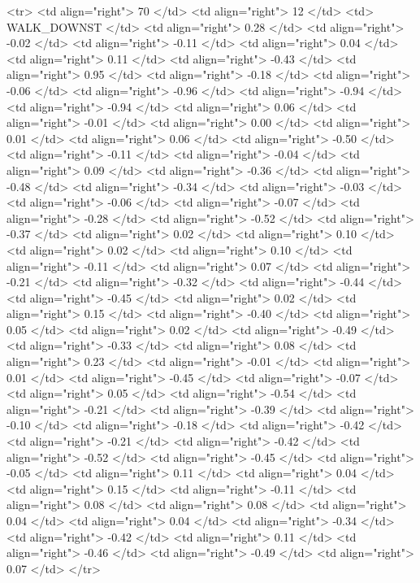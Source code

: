   <tr> <td align="right"> 70 </td> <td align="right">  12 </td> <td> WALK_DOWNST </td> <td align="right"> 0.28 </td> <td align="right"> -0.02 </td> <td align="right"> -0.11 </td> <td align="right"> 0.04 </td> <td align="right"> 0.11 </td> <td align="right"> -0.43 </td> <td align="right"> 0.95 </td> <td align="right"> -0.18 </td> <td align="right"> -0.06 </td> <td align="right"> -0.96 </td> <td align="right"> -0.94 </td> <td align="right"> -0.94 </td> <td align="right"> 0.06 </td> <td align="right"> -0.01 </td> <td align="right"> 0.00 </td> <td align="right"> 0.01 </td> <td align="right"> 0.06 </td> <td align="right"> -0.50 </td> <td align="right"> -0.11 </td> <td align="right"> -0.04 </td> <td align="right"> 0.09 </td> <td align="right"> -0.36 </td> <td align="right"> -0.48 </td> <td align="right"> -0.34 </td> <td align="right"> -0.03 </td> <td align="right"> -0.06 </td> <td align="right"> -0.07 </td> <td align="right"> -0.28 </td> <td align="right"> -0.52 </td> <td align="right"> -0.37 </td> <td align="right"> 0.02 </td> <td align="right"> 0.10 </td> <td align="right"> 0.02 </td> <td align="right"> 0.10 </td> <td align="right"> -0.11 </td> <td align="right"> 0.07 </td> <td align="right"> -0.21 </td> <td align="right"> -0.32 </td> <td align="right"> -0.44 </td> <td align="right"> -0.45 </td> <td align="right"> 0.02 </td> <td align="right"> 0.15 </td> <td align="right"> -0.40 </td> <td align="right"> 0.05 </td> <td align="right"> 0.02 </td> <td align="right"> -0.49 </td> <td align="right"> -0.33 </td> <td align="right"> 0.08 </td> <td align="right"> 0.23 </td> <td align="right"> -0.01 </td> <td align="right"> 0.01 </td> <td align="right"> -0.45 </td> <td align="right"> -0.07 </td> <td align="right"> 0.05 </td> <td align="right"> -0.54 </td> <td align="right"> -0.21 </td> <td align="right"> -0.39 </td> <td align="right"> -0.10 </td> <td align="right"> -0.18 </td> <td align="right"> -0.42 </td> <td align="right"> -0.21 </td> <td align="right"> -0.42 </td> <td align="right"> -0.52 </td> <td align="right"> -0.45 </td> <td align="right"> -0.05 </td> <td align="right"> 0.11 </td> <td align="right"> 0.04 </td> <td align="right"> 0.15 </td> <td align="right"> -0.11 </td> <td align="right"> 0.08 </td> <td align="right"> 0.08 </td> <td align="right"> 0.04 </td> <td align="right"> 0.04 </td> <td align="right"> -0.34 </td> <td align="right"> -0.42 </td> <td align="right"> 0.11 </td> <td align="right"> -0.46 </td> <td align="right"> -0.49 </td> <td align="right"> 0.07 </td> </tr>
